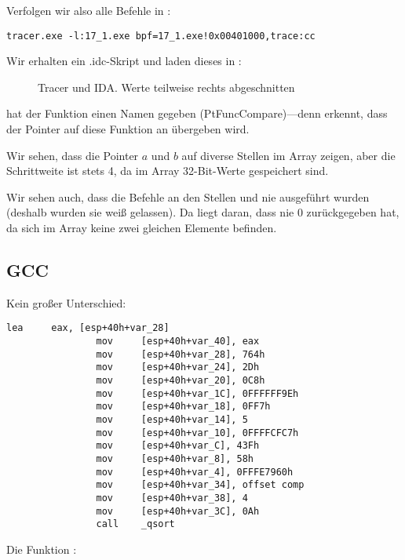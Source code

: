 Verfolgen wir also alle Befehle in \comp:

\begin{lstlisting}
tracer.exe -l:17_1.exe bpf=17_1.exe!0x00401000,trace:cc
\end{lstlisting}

Wir erhalten ein .idc-Skript und laden dieses in \IDA:

\begin{figure}[H]
\centering
{}
\caption{Tracer und IDA. Werte teilweise rechts abgeschnitten}  
\label{fig:qsort_tracer_cc}
\end{figure}
\IDA hat der Funktion einen Namen gegeben (PtFuncCompare)---denn \IDA erkennt, dass der Pointer auf diese Funktion an
\qsort übergeben wird.

Wir sehen, dass die Pointer $a$ und $b$ auf diverse Stellen im Array zeigen, aber die Schrittweite ist stets 4, da im
Array 32-Bit-Werte gespeichert sind.

Wir sehen auch, dass die Befehle an den Stellen  und  nie ausgeführt wurden (deshalb wurden
sie weiß gelassen). Da liegt daran, dass \comp nie 0 zurückgegeben hat, da sich im Array keine zwei gleichen Elemente
befinden.

\subsection{GCC}

Kein großer Unterschied:

\begin{lstlisting}[caption=GCC,style=customasmx86]
                lea     eax, [esp+40h+var_28]
                mov     [esp+40h+var_40], eax
                mov     [esp+40h+var_28], 764h
                mov     [esp+40h+var_24], 2Dh
                mov     [esp+40h+var_20], 0C8h
                mov     [esp+40h+var_1C], 0FFFFFF9Eh
                mov     [esp+40h+var_18], 0FF7h
                mov     [esp+40h+var_14], 5
                mov     [esp+40h+var_10], 0FFFFCFC7h
                mov     [esp+40h+var_C], 43Fh
                mov     [esp+40h+var_8], 58h
                mov     [esp+40h+var_4], 0FFFE7960h
                mov     [esp+40h+var_34], offset comp
                mov     [esp+40h+var_38], 4
                mov     [esp+40h+var_3C], 0Ah
                call    _qsort
\end{lstlisting}

Die Funktion \comp:

